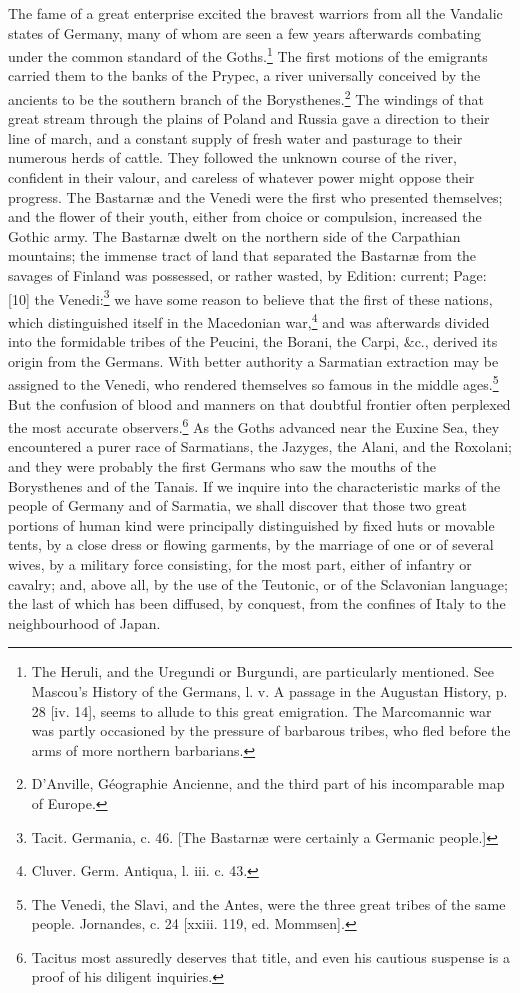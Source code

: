 The fame of a great enterprise excited the bravest warriors from all the Vandalic states of Germany, many of whom are seen a few years afterwards combating under the common standard of the Goths.\footnote{The Heruli, and the Uregundi or Burgundi, are particularly mentioned. See Mascou\texthebrew{}’s History of the Germans, l. v. A passage in the Augustan History, p. 28 [iv. 14], seems to allude to this great emigration. The Marcomannic war was partly occasioned by the pressure of barbarous tribes, who fled before the arms of more northern barbarians.} The first motions of the emigrants carried them to the banks of the Prypec, a river universally conceived by the ancients to be the southern branch of the Borysthenes.\footnote{D\texthebrew{}’Anville, Géographie Ancienne, and the third part of his incomparable map of Europe.} The windings of that great stream through the plains of Poland and Russia gave a direction to their line of march, and a constant supply of fresh water and pasturage to their numerous herds of cattle. They followed the unknown course of the river, confident in their valour, and careless of whatever power might oppose their progress. The Bastarnæ and the Venedi were the first who presented themselves; and the flower of their youth, either from choice or compulsion, increased the Gothic army. The Bastarnæ dwelt on the northern side of the Carpathian mountains; the immense tract of land that separated the Bastarnæ from the savages of Finland was possessed, or rather wasted, by Edition: current; Page: [10] the Venedi:\footnote{Tacit. Germania, c. 46. [The Bastarnæ were certainly a Germanic people.]} we have some reason to believe that the first of these nations, which distinguished itself in the Macedonian war,\footnote{Cluver. Germ. Antiqua, l. iii. c. 43.} and was afterwards divided into the formidable tribes of the Peucini, the Borani, the Carpi, \&c., derived its origin from the Germans. With better authority a Sarmatian extraction may be assigned to the Venedi, who rendered themselves so famous in the middle ages.\footnote{The Venedi, the Slavi, and the Antes, were the three great tribes of the same people. Jornandes, c. 24 [xxiii. 119, ed. Mommsen].} But the confusion of blood and manners on that doubtful frontier often perplexed the most accurate observers.\footnote{Tacitus most assuredly deserves that title, and even his cautious suspense is a proof of his diligent inquiries.} As the Goths advanced near the Euxine Sea, they encountered a purer race of Sarmatians, the Jazyges, the Alani, and the Roxolani; and they were probably the first Germans who saw the mouths of the Borysthenes and of the Tanais. If we inquire into the characteristic marks of the people of Germany and of Sarmatia, we shall discover that those two great portions of human kind were principally distinguished by fixed huts or movable tents, by a close dress or flowing garments, by the marriage of one or of several wives, by a military force consisting, for the most part, either of infantry or cavalry; and, above all, by the use of the Teutonic, or of the Sclavonian language; the last of which has been diffused, by conquest, from the confines of Italy to the neighbourhood of Japan.


